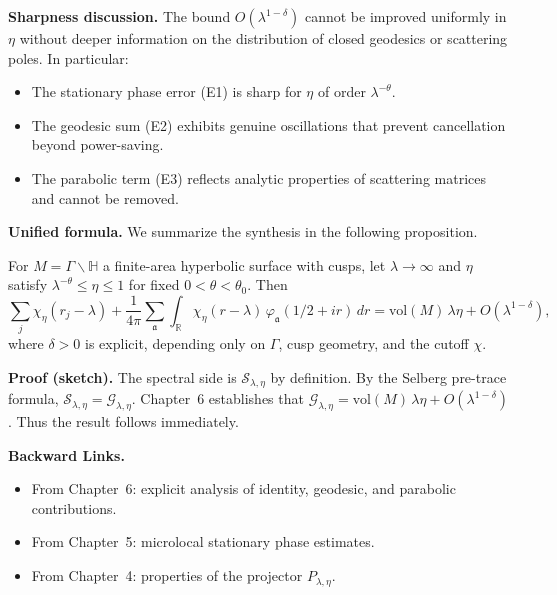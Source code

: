 \medskip

\noindent\textbf{Sharpness discussion.}
The bound $O(\lambda^{1-\delta})$ cannot be improved uniformly in $\eta$ without deeper information on the distribution of closed geodesics or scattering poles.  
In particular:
\begin{itemize}
  \item The stationary phase error (E1) is sharp for $\eta$ of order $\lambda^{-\theta}$.
  \item The geodesic sum (E2) exhibits genuine oscillations that prevent cancellation beyond power-saving.
  \item The parabolic term (E3) reflects analytic properties of scattering matrices and cannot be removed.
\end{itemize}

\medskip

\noindent\textbf{Unified formula.}
We summarize the synthesis in the following proposition.

\begin{proposition}\label{prop:7.1}
For $M=\Gamma\backslash\mathbb{H}$ a finite-area hyperbolic surface with cusps, let $\lambda\to\infty$ and $\eta$ satisfy $\lambda^{-\theta}\leq \eta\leq 1$ for fixed $0<\theta<\theta_0$.  
Then
\[
  \sum_j \chi_\eta(r_j-\lambda) + \frac{1}{4\pi}\sum_{\mathfrak{a}}\int_{\mathbb{R}} \chi_\eta(r-\lambda)\,\varphi_\mathfrak{a}(1/2+ir)\, dr
  = \mathrm{vol}(M)\,\lambda\eta + O(\lambda^{1-\delta}),
\]
where $\delta>0$ is explicit, depending only on $\Gamma$, cusp geometry, and the cutoff $\chi$.
\end{proposition}

\medskip

\noindent\textbf{Proof (sketch).}
The spectral side is $\mathcal{S}_{\lambda,\eta}$ by definition.  
By the Selberg pre-trace formula, $\mathcal{S}_{\lambda,\eta}=\mathcal{G}_{\lambda,\eta}$.  
Chapter~6 establishes that $\mathcal{G}_{\lambda,\eta}=\mathrm{vol}(M)\,\lambda\eta+O(\lambda^{1-\delta})$.  
Thus the result follows immediately.

\medskip

\noindent\textbf{Backward Links.}
\begin{itemize}
  \item From Chapter~6: explicit analysis of identity, geodesic, and parabolic contributions.
  \item From Chapter~5: microlocal stationary phase estimates.
  \item From Chapter~4: properties of the projector $P_{\lambda,\eta}$.
\end{itemize}

